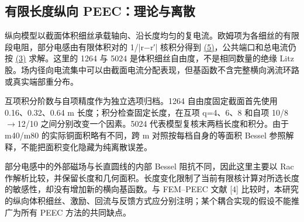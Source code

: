 \documentclass[journal,10pt]{IEEEtran}
\begin{document}
\subsection*{有限长度纵向 PEEC：理论与离散}
\hypertarget{02.peec_method.heading}{}
纵向模型以截面体积细丝承载轴向、沿长度均匀的复电流。欧姆项为各细丝的有限段电阻，部分电感由有限体积对的 1/|r−r′| 核积分得到 \href{paper_zh-CN_ieee.pdf#E08}{(5)}，公共端口和总电流仍按 \href{paper_zh-CN_ieee.pdf#E04}{(3)} 求解。这里的 1264 与 5024 是体积细丝自由度，不是相同数量的绝缘 Litz 股。场内径向电流集中可以由截面电流分配表现，但基函数不含完整横向涡流环路或真实端部重分布。


互项积分阶数与自项精度作为独立选项归档。1264 自由度固定截面首先使用 0.16、0.32、0.64 m 长度；积分检查固定长度，在互项 q=4、6、8 和自项 10/8\(\to\)12/10 之间分别改变一个因素。5024 代表模型复核末两档长度和积分。由于 m40/m80 的实际铜面积略有不同，跨 m 对照按每档自身的等面积 Bessel 参照解释，不能把面积变化隐藏为纯离散误差。


部分电感中的外部磁场与长直圆线的内部 Bessel 阻抗不同，因此这里主要以 Rac 作解析比较，并保留长度和几何面积。长度变化限制了当前有限核计算对所选长度的敏感性，却没有增加新的横向基函数。与 FEM–PEEC 文献 [4] 比较时，本研究的纵向体积细丝、激励、回流与反馈方式应分别注明；某个耦合实现的假设不能推广为所有 PEEC 方法的共同缺点。
\end{document}
